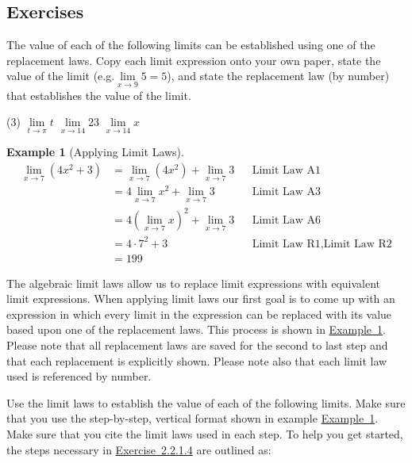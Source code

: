 \documentclass[12pt,]{book}
\theoremstyle{plain}
\theoremstyle{definition}
\theoremstyle{definition}
\theoremstyle{definition}
\newtheorem{example}[theorem]{Example}
\theoremstyle{definition}
\theoremstyle{definition}
\numberwithin{equation}{section}
\begin{document}
\subsection[{Exercises}]{Exercises}\label{exercises-6}
\hypertarget{exercisegroup-16}{}\par\noindent The value of each of the following limits can be established using one of the replacement laws. Copy each limit expression onto your own paper, state the value of the limit (e.g.\@ \(\lim\limits_{x\to9}5=5\)), and state the replacement law (by number) that establishes the value of the limit.%
\begin{exercisegroup}(3)
\exercise[1.]\hypertarget{exercise-66}{}\(\lim\limits_{t\to\pi}t\)%
\exercise[2.]\hypertarget{exercise-67}{}\(\lim\limits_{x\to14}23\)%
\exercise[3.]\hypertarget{exercise-68}{}\(\lim\limits_{x\to14}x\)%
\end{exercisegroup}
\par\smallskip\noindent
\begin{example}[Applying Limit Laws]\label{example-apply-limit-laws}
\begin{align*}
\lim_{x\to7}\left(4x^2+3\right)&=\lim_{x\to7}\left(4x^2\right)+\lim_{x\to7}3&&\hyperref[lla1]{\text{Limit Law A1}}\\
&=4\lim_{x\to7}x^2+\lim_{x\to7}3&&\hyperref[lla3]{\text{Limit Law A3}}\\
&=4\left(\lim_{x\to7}x\right)^2+\lim_{x\to7}3&&\hyperref[lla6]{\text{Limit Law A6}}\\
&=4\cdot7^2+3&&\hyperref[llr1]{\text{Limit Law R1}}, \hyperref[llr2]{\text{Limit Law R2}}\\
&=199
\end{align*}%
\end{example}
\hypertarget{exercisegroup-17}{}\par\noindent The algebraic limit laws allow us to replace limit expressions with equivalent limit expressions. When applying limit laws our first goal is to come up with an expression in which every limit in the expression can be replaced with its value based upon one of the replacement laws. This process is shown in \hyperref[example-apply-limit-laws]{Example~\ref{example-apply-limit-laws}}. Please note that all replacement laws are saved for the second to last step and that each replacement is explicitly shown. Please note also that each limit law used is referenced by number.%
\par
Use the limit laws to establish the value of each of the following limits. Make sure that you use the step-by-step, vertical format shown in example \hyperref[example-apply-limit-laws]{Example~\ref{example-apply-limit-laws}}. Make sure that you cite the limit laws used in each step. To help you get started, the steps necessary in \hyperlink{exercise-first-apply-limit-laws}{Exercise~2.2.1.4} are outlined as:%
\end{document}
